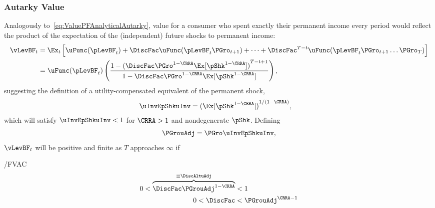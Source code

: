 \documentclass[BufferStockTheory]{subfiles}
\begin{document}
\subsubsection{Autarky Value}
Analogously to~\eqref{eq:ValuePFAnalyticalAutarky}, value for a consumer who spent exactly their permanent income every period would reflect the product of the expectation of the (independent) future shocks to permanent income:\hypertarget{uInvEpShkuInv}{}
\begin{align*}
  \vLevBF_{t}  & = \Ex_{t}\left[\uFunc(\pLevBF_{t}) + \DiscFac \uFunc(\pLevBF_{t}\PGro_{t+1}) + \cdots + \DiscFac^{T-t}\uFunc(\pLevBF_{t}\PGro_{t+1}\ldots\PGro_{T})\right] \\
               & = \uFunc(\pLevBF_{t})\left(\frac{1-{(\DiscFac \PGro^{1-\CRRA}\Ex[\pShk^{1-\CRRA}])}^{T-t+1}}{1-\DiscFac \PGro^{1-\CRRA} \Ex[\pShk^{1-\CRRA}]}\right),
\end{align*}
suggesting the definition of a utility-compensated equivalent of the permanent shock,\hypertarget{PermGrouAdj}{}
\begin{align}
  \uInvEpShkuInv  & = {(\Ex[\pShk^{1-\CRRA}])}^{1/(1-\CRRA)} \label{eq:uInvEpShkuInv},
\end{align}
which will satisfy $\uInvEpShkuInv < 1$ for $\CRRA>1$ and nondegenerate $\pShk$.%
\hypertarget{DiscAltuAdj}{} Defining
\begin{equation}
  \label{eq:PGrouAdj}
  \PGrouAdj = \PGro \uInvEpShkuInv,
\end{equation}
$\vLevBF_{t}$ will be positive and finite as $T$ approaches $\infty$ if\hypertarget{FVAC}{}
\begin{verbatimwrite}{\EqDir/FVAC}
  \begin{equation}\label{eq:FVAC}
    \begin{split}
      0 < \overbrace{\DiscFac \PGrouAdj^{1-\CRRA} }^{\equiv \DiscAltuAdj}  & < 1 
      \\ 0 < \DiscFac  & < \PGrouAdj^{\CRRA-1} 
    \end{split}
  \end{equation}
\end{verbatimwrite}
{}
\end{document}
